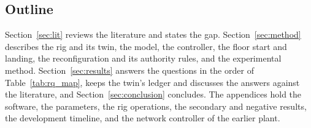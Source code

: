 \subsection{Outline}

Section~\ref{sec:lit} reviews the literature and states the gap. Section~\ref{sec:method} describes the
rig and its twin, the model, the controller, the floor start and landing, the reconfiguration and its authority
rules, and the experimental method. Section~\ref{sec:results} answers the questions in the order of
Table~\ref{tab:rq_map}, keeps the twin's ledger and discusses the answers against the literature, and
Section~\ref{sec:conclusion} concludes. The appendices hold the software, the parameters, the rig operations,
the secondary and negative results, the development timeline, and the network controller of the earlier plant.
